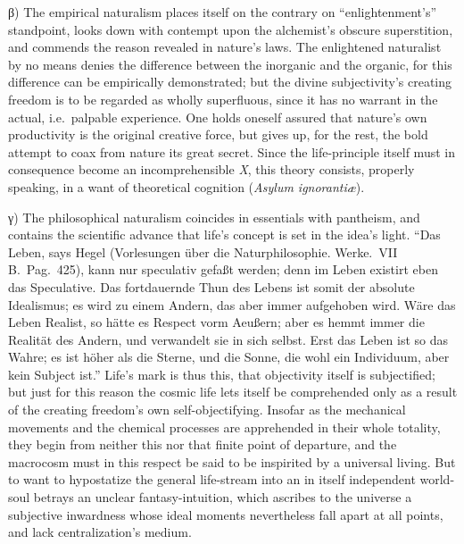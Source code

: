 \documentclass[12pt]{book}
\begin{document}
\noindent β) The empirical naturalism places itself on the contrary on
``enlightenment's'' standpoint, looks down with contempt upon the
alchemist's obscure superstition, and commends the reason revealed in
nature's laws. The enlightened naturalist by no means denies the difference
between the inorganic and the organic, for this difference can be
empirically demonstrated; but the divine subjectivity's creating freedom is
to be regarded as wholly superfluous, since it has no warrant in the actual,
i.e.\ palpable experience. One holds oneself assured that nature's own
productivity is the original creative force, but gives up, for the rest, the
bold attempt to coax from nature its great secret. Since the life-principle
itself must in consequence become an incomprehensible \textit{X}, this
theory consists, properly speaking, in a want of theoretical cognition
(\textit{Asylum ignorantiæ}).

γ) The philosophical naturalism coincides in essentials with pantheism, and
contains the scientific advance that life's concept is set in the idea's
light. ``Das Leben, says Hegel (Vorlesungen über die Naturphilosophie.
Werke.\ VII B.\ Pag.\ 425), kann nur speculativ gefaßt werden; denn im Leben
existirt eben das Speculative. Das fortdauernde Thun des Lebens ist somit
der absolute Idealismus; es wird zu einem Andern, das aber immer aufgehoben
wird. Wäre das Leben Realist, so hätte es Respect vorm Aeußern; aber es
hemmt immer die Realität des Andern, und verwandelt sie in sich selbst. Erst
das Leben ist so das Wahre; es ist höher als die Sterne, und die Sonne, die
wohl ein Individuum, aber kein Subject ist.'' Life's mark is thus this, that
objectivity itself is subjectified; but just for this reason the cosmic life
lets itself be comprehended only as a result of the creating freedom's own
self-objectifying. Insofar as the mechanical movements and the chemical
processes are apprehended in their whole totality, they begin from neither
this nor that finite point of departure, and the macrocosm must in this
respect be said to be inspirited by a universal living. But to want to
hypostatize the general life-stream into an in itself independent world-soul
betrays an unclear fantasy-intuition, which ascribes to the universe a
subjective inwardness whose ideal moments nevertheless fall apart at all
points, and lack centralization's medium.
\end{document}
